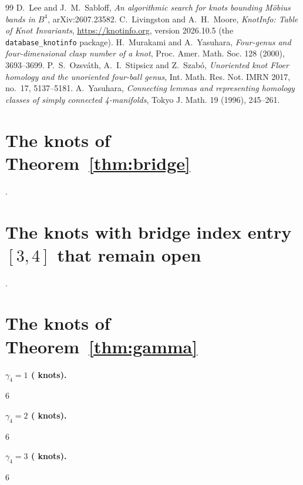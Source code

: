 \documentclass[11pt]{amsart}
\theoremstyle{definition}
\theoremstyle{remark}
\numberwithin{equation}{section}
\begin{document}
\begin{thebibliography}{99}
 D.~Lee and J.~M.~Sabloff, \emph{An algorithmic search for knots bounding
M\"obius bands in $B^4$}, arXiv:2607.23582.
 C.~Livingston and A.~H.~Moore, \emph{KnotInfo: Table of Knot Invariants},
\url{https://knotinfo.org}, version 2026.10.5 (the \texttt{database\_knotinfo} package).
 H.~Murakami and A.~Yasuhara, \emph{Four-genus and four-dimensional clasp number
of a knot}, Proc. Amer. Math. Soc. 128 (2000), 3693--3699.
 P.~S.~Ozsv\'ath, A.~I.~Stipsicz and Z.~Szab\'o, \emph{Unoriented knot Floer
homology and the unoriented four-ball genus}, Int. Math. Res. Not. IMRN 2017, no.~17,
5137--5181.
 A.~Yasuhara, \emph{Connecting lemmas and representing homology classes of simply
connected 4-manifolds}, Tokyo J. Math. 19 (1996), 245--261.
\end{thebibliography}

\appendix
\section{The knots of Theorem~\ref{thm:bridge}}\label{app:bclosed}
{\small\raggedright
\bclosedlist.\par}

\section{The knots with bridge index entry \texorpdfstring{$[3,4]$}{[3,4]} that remain open}\label{app:bopen}
{\small\raggedright
\bopenlist.\par}

\section{The knots of Theorem~\ref{thm:gamma}}\label{app:glist}

{\footnotesize
\noindent\textbf{$\gamma_4=1$ (\nsettledone{} knots).}
\begin{multicols}{6}\raggedright
\listone
\end{multicols}

\noindent\textbf{$\gamma_4=2$ (\nsettledtwo{} knots).}
\begin{multicols}{6}\raggedright
\listtwo
\end{multicols}

\noindent\textbf{$\gamma_4=3$ (\nsettledthree{} knots).}
\begin{multicols}{6}\raggedright
\listthree
\end{multicols}
}
\end{document}
